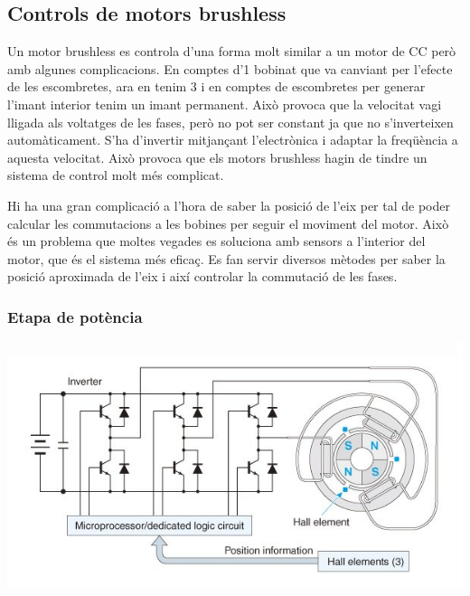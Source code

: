 \subsection{Controls de motors brushless}
Un motor brushless es controla d'una forma molt similar a un motor de CC però amb algunes complicacions. En comptes d'1 bobinat que va canviant per l'efecte de les escombretes, ara en tenim 3 i en comptes de escombretes per generar l'imant interior tenim un imant permanent. Això provoca que la velocitat vagi lligada als voltatges de les fases, però no pot ser constant ja que no s'inverteixen automàticament. S'ha d'invertir mitjançant l'electrònica i adaptar la freqüència a aquesta velocitat. Això provoca que els motors brushless hagin de tindre un sistema de control molt més complicat.

Hi ha una gran complicació a l'hora de saber la posició de l'eix per tal de poder calcular les commutacions a les bobines per seguir el moviment del motor. Això és un problema que moltes vegades es soluciona amb sensors a l'interior del motor, que és el sistema més eficaç. Es fan servir diversos mètodes per saber la posició aproximada de l'eix i així controlar la commutació de les fases.

\subsubsection{Etapa de potència}

\includegraphics[width=\textwidth]{Motors/BLDC1}

